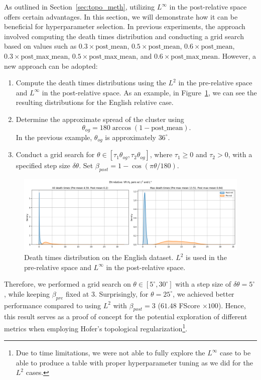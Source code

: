 \documentclass[../main.tex]{subfiles}
\begin{document}
As outlined in Section~\ref{sec:topo_meth}, utilizing $L^\infty$ in the post-relative space offers certain advantages. In this section, we will demonstrate how it can be beneficial for hyperparameter selection. In previous experiments, the approach involved computing the death times distribution and conducting a grid search based on values such as $0.3\times \text{post\_mean}$, $0.5\times \text{post\_mean}$, $0.6\times \text{post\_mean}$, $0.3\times \text{post\_max\_mean}$, $0.5\times \text{post\_max\_mean}$, and $0.6\times \text{post\_max\_mean}$. However, a new approach can be adopted:
\begin{enumerate}
    \item Compute the death times distributions using the $L^2$ in the pre-relative space and $L^\infty$ in the post-relative space. As an example, in Figure~\ref{fig:distMix}, we can see the resulting distributions for the English relative case.

    \item Determine the approximate spread of the cluster using
    \[\theta_{og} = 180 \arccos(1-\text{post\_mean}).\]
    In the previous example, $\theta_{og}$ is approximately $36^{\circ}$.
    
    \item Conduct a grid search for $\theta \in [\tau_1 \theta_{og}, \tau_2\theta_{og}]$, where $\tau_1\geq 0$ and $\tau_2> 0$, with a specified step size $\delta \theta$. Set $\beta_{post} = 1-\cos(\pi \theta / 180)$.
\end{enumerate}

\begin{figure}[!ht]
    \centering
    \includegraphics[width=\textwidth]{figures/rs/stitching/mix_en_relative_seed0.png} 
    \caption{Death times distribution on the English dataset. $L^2$ is used in the pre-relative space and $L^\infty$ in the post-relative space.}
    \label{fig:distMix}
\end{figure}

Therefore, we performed a grid search on $\theta \in [5^{\circ}, 30^{\circ}]$ with a step size of $\delta \theta = 5^{\circ}$, while keeping $\beta_{pre}$ fixed at 3. Surprisingly, for $\theta = 25^{\circ}$, we achieved better performance compared to using $L^2$ with $\beta_{post} = 3$ ($61.48$ FScore $\times 100$). Hence, this result serves as a proof of concept for the potential exploration of different metrics when employing Hofer's topological regularization\footnote{Due to time limitations, we were not able to fully explore the $L^\infty$ case to be able to produce a table with proper hyperparameter tuning as we did for the $L^2$ cases.}.
\end{document}
